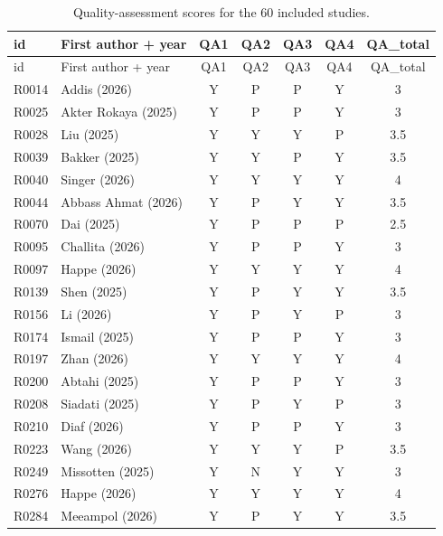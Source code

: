 \begin{longtable}{@{}lp{}ccccc@{}}
\caption{Quality-assessment scores for the 60 included studies.}\label{tab:qa-scores}\\
\hline
id & First author + year & QA1 & QA2 & QA3 & QA4 & QA\_total \\
\hline
\endfirsthead
\hline
id & First author + year & QA1 & QA2 & QA3 & QA4 & QA\_total \\
\hline
\endhead
\hline
\endfoot
R0014 & Addis (2026) \cite{R0014_Addis_2026} & Y & P & P & Y & 3 \\
R0025 & Akter Rokaya (2025) \cite{R0025_2025} & Y & P & P & Y & 3 \\
R0028 & Liu (2025) \cite{R0028_Liu_2025} & Y & Y & Y & P & 3.5 \\
R0039 & Bakker (2025) \cite{R0039_Bakker_2025} & Y & Y & P & Y & 3.5 \\
R0040 & Singer (2026) \cite{R0040_Singer_2026} & Y & Y & Y & Y & 4 \\
R0044 & Abbass Ahmat (2026) \cite{R0044_Abbass_Ahmat_2026} & Y & P & Y & Y & 3.5 \\
R0070 & Dai (2025) \cite{R0070_Dai_2025} & Y & P & P & P & 2.5 \\
R0095 & Challita (2026) \cite{R0095_Challita_2026} & Y & P & P & Y & 3 \\
R0097 & Happe (2026) \cite{R0097_Happe_2026} & Y & Y & Y & Y & 4 \\
R0139 & Shen (2025) \cite{R0139_Shen_2025} & Y & P & Y & Y & 3.5 \\
R0156 & Li (2026) \cite{R0156_Li_2026} & Y & P & Y & P & 3 \\
R0174 & Ismail (2025) \cite{R0174_Ismail_2025} & Y & P & P & Y & 3 \\
R0197 & Zhan (2026) \cite{R0197_Zhan_2026} & Y & Y & Y & Y & 4 \\
R0200 & Abtahi (2025) \cite{R0200_Abtahi_2025} & Y & P & P & Y & 3 \\
R0208 & Siadati (2025) \cite{R0208_Siadati_2025} & Y & P & Y & P & 3 \\
R0210 & Diaf (2026) \cite{R0210_Diaf_2026} & Y & P & P & Y & 3 \\
R0223 & Wang (2026) \cite{R0223_Wang_2026} & Y & Y & Y & P & 3.5 \\
R0249 & Missotten (2025) \cite{R0249_Missotten_2025} & Y & N & Y & Y & 3 \\
R0276 & Happe (2026) \cite{R0276_Happe_2026} & Y & Y & Y & Y & 4 \\
R0284 & Meeampol (2026) \cite{R0284_Meeampol_2026} & Y & P & Y & Y & 3.5 \\

\end{longtable}
